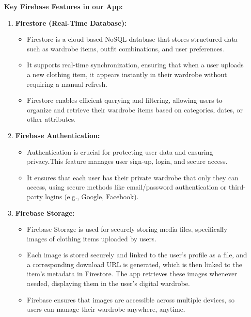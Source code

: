 \textbf{Key Firebase Features in our App:}
\begin{enumerate}
    \item \textbf{Firestore (Real-Time Database):}
    \begin{itemize}
        \item Firestore is a cloud-based NoSQL database that stores structured data such as wardrobe items, outfit combinations, and user preferences.
        \item It supports real-time synchronization, ensuring that when a user uploads a new clothing item, it appears instantly in their wardrobe without requiring a manual refresh.
        \item Firestore enables efficient querying and filtering, allowing users to organize and retrieve their wardrobe items based on categories, dates, or other attributes.
    \end{itemize}
    \item \textbf{Firebase Authentication:}
     \begin{itemize}
        \item Authentication is crucial for protecting user data and ensuring privacy.This feature manages user sign-up, login, and secure access.
        \item It ensures that each user has their private wardrobe that only they can access, using secure methods like email/password authentication or third-party logins (e.g., Google, Facebook).
    \end{itemize}
    \item \textbf{Firebase Storage:}
     \begin{itemize}
        \item Firebase Storage is used for securely storing media files, specifically images of clothing items uploaded by users.
        \item Each image is stored securely and linked to the user’s profile as a file, and a corresponding download URL is generated, which is then linked to the item’s metadata in Firestore. The app retrieves these images whenever needed, displaying them in the user’s digital wardrobe.
        \item Firebase ensures that images are accessible across multiple devices, so users can manage their wardrobe anywhere, anytime.
    \end{itemize} 
\end{enumerate}


